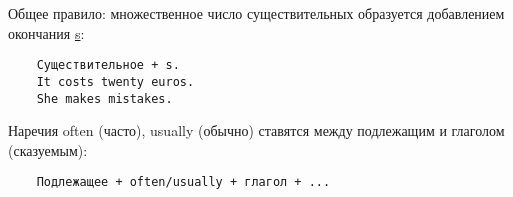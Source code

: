 Общее правило: множественное число существительных образуется добавлением окончания \underline{s}:
\begin{verbatim}
    Существительное + s.
    It costs twenty euros.
    She makes mistakes.
\end{verbatim}

Наречия often (часто), usually (обычно) ставятся между подлежащим и глаголом (сказуемым):
\begin{verbatim}
    Подлежащее + often/usually + глагол + ...
\end{verbatim}